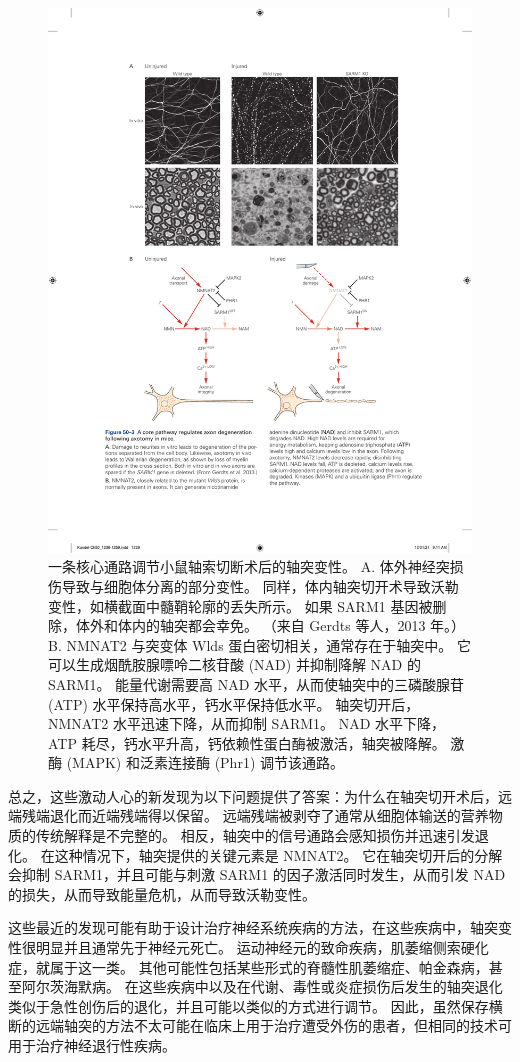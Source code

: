 \begin{figure}[htbp]
	\centering
	\includegraphics[width=0.8\linewidth]{chap50/fig_50_3}
	\caption{一条核心通路调节小鼠轴索切断术后的轴突变性。 A. 体外神经突损伤导致与细胞体分离的部分变性。 同样，体内轴突切开术导致沃勒变性，如横截面中髓鞘轮廓的丢失所示。 如果 SARM1 基因被删除，体外和体内的轴突都会幸免。 （来自 Gerdts 等人，2013 年。）B. NMNAT2 与突变体 Wlds 蛋白密切相关，通常存在于轴突中。 它可以生成烟酰胺腺嘌呤二核苷酸 (NAD) 并抑制降解 NAD 的 SARM1。 能量代谢需要高 NAD 水平，从而使轴突中的三磷酸腺苷 (ATP) 水平保持高水平，钙水平保持低水平。 轴突切开后，NMNAT2 水平迅速下降，从而抑制 SARM1。 NAD 水平下降，ATP 耗尽，钙水平升高，钙依赖性蛋白酶被激活，轴突被降解。 激酶 (MAPK) 和泛素连接酶 (Phr1) 调节该通路。}
	\label{fig:50_3}
\end{figure}


总之，这些激动人心的新发现为以下问题提供了答案：为什么在轴突切开术后，远端残端退化而近端残端得以保留。 远端残端被剥夺了通常从细胞体输送的营养物质的传统解释是不完整的。 相反，轴突中的信号通路会感知损伤并迅速引发退化。 在这种情况下，轴突提供的关键元素是 NMNAT2。 它在轴突切开后的分解会抑制 SARM1，并且可能与刺激 SARM1 的因子激活同时发生，从而引发 NAD 的损失，从而导致能量危机，从而导致沃勒变性。

这些最近的发现可能有助于设计治疗神经系统疾病的方法，在这些疾病中，轴突变性很明显并且通常先于神经元死亡。 运动神经元的致命疾病，肌萎缩侧索硬化症，就属于这一类。 其他可能性包括某些形式的脊髓性肌萎缩症、帕金森病，甚至阿尔茨海默病。 在这些疾病中以及在代谢、毒性或炎症损伤后发生的轴突退化类似于急性创伤后的退化，并且可能以类似的方式进行调节。 因此，虽然保存横断的远端轴突的方法不太可能在临床上用于治疗遭受外伤的患者，但相同的技术可用于治疗神经退行性疾病。


